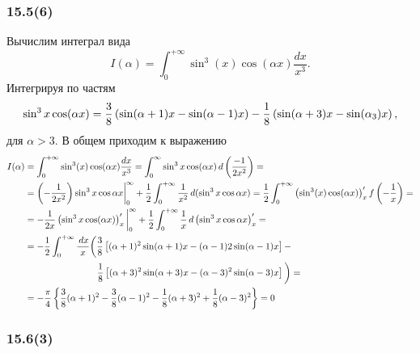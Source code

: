 \subsubsection*{15.5(6)}

Вычислим интеграл вида
\begin{equation*}
    I(\alpha) = \int_{0}^{+\infty}  \sin^3 (x) \cos (\alpha x) \frac{dx}{x^3}.
\end{equation*}
Интегрируя по частям
\begin{equation*}
    \sin^3 x \cos (\alpha x) = \frac{3}{8} \left(
        \sin(\alpha+1)x - \sin (\alpha - 1)x
    \right) - \frac{1}{8} \left(
        \sin(\alpha+3)x - \sin(\alpha_3)x
    \right),
\end{equation*}
для $\alpha > 3$. В общем приходим к выражению
\begin{align*}
    I(\alpha) 
    &=
     \int_{0}^{+\infty}  \sin^3 (x) \cos (\alpha x) \frac{dx}{x^3}
    =
     \int_0^\infty \sin^3 x \cos(\alpha x) \d \l(
        \frac{-1}{2x^2}
    \r) 
    = 
    \\
    &=
    \l(
        -\frac{1}{2x^2}
    \r) \sin^3 x \cos \alpha x \bigg|_0^\infty + \frac{1}{2} \int_{0}^{+\infty} 
    \frac{1}{x^2} \d (\sin^3 x \cos \alpha x) = 
    \frac{1}{2} \int_{0}^{+\infty} \l(
        \sin^3 (x) \cos (\alpha x)
    \r)'_x  f\left(-\frac{1}{x}\right) 
    = 
    \\
    &= 
    - \frac{1}{2x} \l(
        \sin^3 x \cos(\alpha x)
    \r)'_x \bigg|_0^\infty + 
    \frac{1}{2} \int_{0}^{+\infty}  \frac{1}{x} \d \l(
        \sin^3 x \cos \alpha x
    \r)'_x
    = 
    \\ 
    &=
    -\frac{1}{2} \int_{0}^{+\infty} \frac{\d x}{x} \bigg(
        \frac{3}{8}\left[
            (\alpha+1)^2 \sin (\alpha+1)x - (\alpha-1)2 \sin (\alpha-1)x
        \right] - \\ 
        & 
        \phantom{=
    -\frac{1}{2} \int_{0}^{+\infty} \frac{\d x}{x} \bigg(\ }
         \frac{1}{8}\left[
            (\alpha+3)^2 \sin (\alpha+3) x - (\alpha-3)^2 \sin  (\alpha-3)x
        \right]
    \bigg) 
    = \\
    &=
    -\frac{\pi}{4} \left\{
        \frac{3}{8} (\alpha+1)^2 - \frac{3}{8} (\alpha-1)^2 - \frac{1}{8} (\alpha + 3)^2+ \frac{1}{8} (\alpha-3)^2
    \right\} = 0 
\end{align*}


\subsubsection*{15.6(3)}

